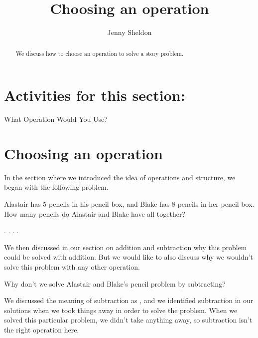 \documentclass{ximera}
\title{Choosing an operation}
\author{Jenny Sheldon}
\begin{document}
\begin{abstract}
We discuss how to choose an operation to solve a story problem.
\end{abstract}
\maketitle


\section{Activities for this section:} What Operation Would You Use?

\section{Choosing an operation}

In the section where we introduced the idea of operations and structure, we began with the following problem. 

\begin{question}
Alastair has $5$ pencils in his pencil box, and Blake has $8$ pencils in her pencil box. How many pencils do Alastair and Blake have all together?

\begin{multipleChoice}
.
.
.
.
\end{multipleChoice}
\end{question}

We then discussed in our section on addition and subtraction why this problem could be solved with addition. But we would like to also discuss why we wouldn't solve this problem with any other operation.

\begin{question}
Why don't we solve Alastair and Blake's pencil problem by subtracting?

\begin{explanation}
We discussed the meaning of subtraction as , and we identified subtraction in our solutions when we took things away in order to solve the problem. When we solved this particular problem, we didn't take anything away, so subtraction isn't the right operation here.
\end{explanation}
\end{question}
\end{document}
